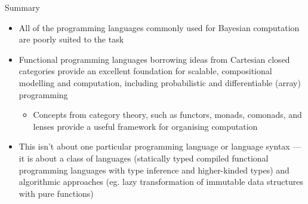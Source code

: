 \documentclass[mathserif,handout]{beamer}
\begin{document}
\begin{frame}{Summary}
\protect\hypertarget{summary}{}

\begin{itemize}

\item
  All of the programming languages commonly used for Bayesian
  computation are poorly suited to the task
\item
  Functional programming languages borrowing ideas from \alert{Cartesian
  closed categories} provide an excellent foundation for scalable, compositional
  modelling and computation, including probabilistic and differentiable (array) programming
  \begin{itemize}
  
  \item
    Concepts from category theory, such as \alert{functors},
    \alert{monads}, \alert{comonads}, and \alert{lenses} provide a useful framework for
    organising computation
  \end{itemize}
\item
  This isn't about one particular programming language or language syntax --- it is about a class of
  languages (statically typed compiled functional programming languages with type
    inference and higher-kinded types) and algorithmic approaches (eg. lazy transformation of immutable data structures with pure functions)
\end{itemize}

\end{frame}
\end{document}

